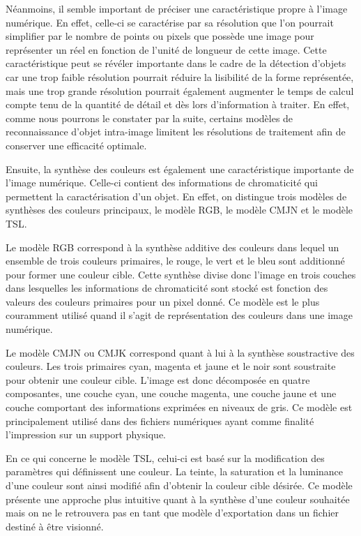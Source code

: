 \documentclass[a4paper,12pt]{article} %
\begin{document}
	Néanmoins, il semble important de préciser une caractéristique propre à l’image numérique. En effet, celle-ci se caractérise par sa résolution que l’on pourrait simplifier par le nombre de points ou pixels que possède une image pour représenter un réel en fonction de l’unité de longueur de cette image. Cette caractéristique peut se révéler importante dans le cadre de la détection d’objets car une trop faible résolution pourrait réduire la lisibilité de la forme représentée, mais une trop grande résolution pourrait également augmenter le temps de calcul compte tenu de la quantité de détail et dès lors d’information à traiter. En effet, comme nous pourrons le constater par la suite, certains modèles de reconnaissance d’objet intra-image limitent les résolutions de traitement afin de conserver une efficacité optimale. \newline
 \par
    Ensuite, la synthèse des couleurs est également une caractéristique importante de l'image numérique. Celle-ci contient des informations de chromaticité qui permettent la caractérisation d'un objet. En effet, on distingue trois modèles de synthèses des couleurs principaux, le modèle RGB, le modèle CMJN et le modèle TSL.\newpage
\par
Le modèle RGB correspond à la synthèse additive des couleurs dans lequel un ensemble de trois couleurs primaires, le rouge, le vert et le bleu sont additionné pour former une couleur cible. Cette synthèse divise donc l’image en trois couches dans lesquelles les informations de chromaticité sont stocké est fonction des valeurs des couleurs primaires pour un pixel donné. Ce modèle est le plus couramment utilisé quand il s’agit de représentation des couleurs dans une image numérique.\newline
\par
Le modèle CMJN ou CMJK correspond quant à lui à la synthèse soustractive des couleurs. Les trois primaires cyan, magenta et jaune et le noir sont soustraite pour obtenir une couleur cible. L’image est donc décomposée en quatre composantes, une couche cyan, une couche magenta, une couche jaune et une couche comportant des informations exprimées en niveaux de gris. Ce modèle est principalement utilisé dans des fichiers numériques ayant comme finalité l’impression sur un support physique.\newline
\par
En ce qui concerne le modèle TSL, celui-ci est basé sur la modification des paramètres qui définissent une couleur. La teinte, la saturation et la luminance d’une couleur sont ainsi modifié afin d’obtenir la couleur cible désirée. Ce modèle présente une approche plus intuitive quant à la synthèse d’une couleur souhaitée mais on ne le retrouvera pas en tant que modèle d’exportation dans un fichier destiné à être visionné.\newline
\end{document}
